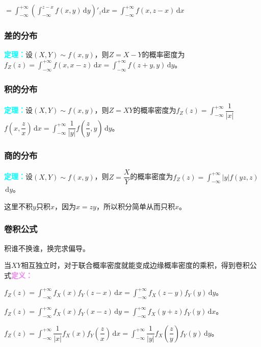 \documentclass[UTF8, 12pt]{ctexart}
\begin{document}
$=\int_{-\infty}^{+\infty}(\int_{-\infty}^{z-x}f(x,y)\,\textrm{d}y)'_z\textrm{d}x=\int_{-\infty}^{+\infty}f(x,z-x)\,\textrm{d}x$

\subsubsection{差的分布}

\textcolor{aqua}{\textbf{定理：}}设$(X,Y)\sim f(x,y)$，则$Z=X-Y$的概率密度为$f_Z(z)=\int_{-\infty}^{+\infty}f(x,x-z)\,\textrm{d}x=\int_{-\infty}^{+\infty}f(z+y,y)\,\textrm{d}y$。

\subsubsection{积的分布}

\textcolor{aqua}{\textbf{定理：}}设$(X,Y)\sim f(x,y)$，则$Z=XY$的概率密度为$f_Z(z)=\displaystyle{\int_{-\infty}^{+\infty}}\dfrac{1}{\vert x\vert}$\\$f\left(x,\dfrac{z}{x}\right)\,\textrm{d}x=\displaystyle{\int_{-\infty}^{+\infty}}\dfrac{1}{\vert y\vert}f\left(\dfrac{z}{y},y\right)\,\textrm{d}y$。

\subsubsection{商的分布}

\textcolor{aqua}{\textbf{定理：}}设$(X,Y)\sim f(x,y)$，则$Z=\dfrac{X}{Y}$的概率密度为$f_Z(z)=\displaystyle{\int_{-\infty}^{+\infty}}\vert y\vert f(yz,z)$\\$\,\textrm{d}y$。

这里不积$y$只积$x$，因为$x=zy$，所以积分简单从而只积$x$。

\subsubsection{卷积公式}

积谁不换谁，换完求偏导。

当$XY$相互独立时，对于联合概率密度就能变成边缘概率密度的乘积，得到卷积公式\textcolor{violet}{\textbf{定义：}}

$f_Z(z)=\int_{-\infty}^{+\infty}f_X(x)f_Y(z-x)\,\textrm{d}x=\int_{-\infty}^{+\infty}f_X(z-y)f_Y(y)\,\textrm{d}y$。

$f_Z(z)=\int_{-\infty}^{+\infty}f_X(x)f_Y(x-z)\,\textrm{d}y=\int_{-\infty}^{+\infty}f_X(y+z)f_Y(y)\,\textrm{d}x$。

$f_Z(z)=\displaystyle{\int_{-\infty}^{+\infty}}\dfrac{1}{\vert x\vert}f_X(x)f_Y\left(\dfrac{z}{x}\right)\,\textrm{d}x=\displaystyle{\int_{-\infty}^{+\infty}}\dfrac{1}{\vert y\vert}f_X\left(\dfrac{z}{y}\right)f_Y(y)\,\textrm{d}y$。
\end{document}
